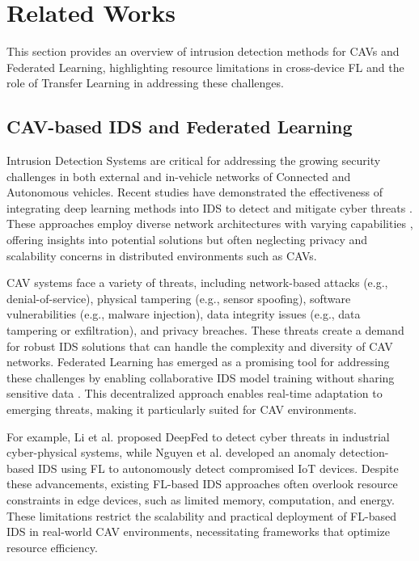 \section{Related Works}
This section provides an overview of intrusion detection methods for CAVs and Federated Learning, highlighting resource limitations in cross-device FL and the role of Transfer Learning in addressing these challenges.

\subsection{CAV-based IDS and Federated Learning}
Intrusion Detection Systems are critical for addressing the growing security challenges in both external and in-vehicle networks of Connected and Autonomous vehicles. Recent studies have demonstrated the effectiveness of integrating deep learning methods into IDS to detect and mitigate cyber threats \cite{s21144736}. These approaches employ diverse network architectures with varying capabilities \cite{lansky2021deep, aleesa2020review, guha2019one}, offering insights into potential solutions but often neglecting privacy and scalability concerns in distributed environments such as CAVs.

CAV systems face a variety of threats, including network-based attacks (e.g., denial-of-service), physical tampering (e.g., sensor spoofing), software vulnerabilities (e.g., malware injection), data integrity issues (e.g., data tampering or exfiltration), and privacy breaches. These threats create a demand for robust IDS solutions that can handle the complexity and diversity of CAV networks. Federated Learning has emerged as a promising tool for addressing these challenges by enabling collaborative IDS model training without sharing sensitive data \cite{chellapandi2023survey, mcmahan2017communication, olagunju2024privacy}. This decentralized approach enables real-time adaptation to emerging threats, making it particularly suited for CAV environments.

For example, Li et al. \cite{li2020deepfed} proposed DeepFed to detect cyber threats in industrial cyber-physical systems, while Nguyen et al. \cite{nguyen2019diot} developed an anomaly detection-based IDS using FL to autonomously detect compromised IoT devices. Despite these advancements, existing FL-based IDS approaches often overlook resource constraints in edge devices, such as limited memory, computation, and energy. These limitations restrict the scalability and practical deployment of FL-based IDS in real-world CAV environments, necessitating frameworks that optimize resource efficiency.

